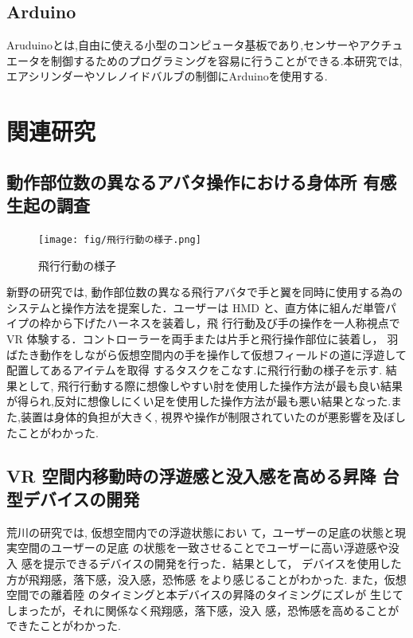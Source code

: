 \subsection{Arduino}

Aruduinoとは,自由に使える小型のコンピュータ基板であり,センサーやアクチュエータを制御するためのプログラミングを容易に行うことができる.本研究では,エアシリンダーやソレノイドバルブの制御にArduinoを使用する.

\section{関連研究}

\subsection{動作部位数の異なるアバタ操作における身体所
有感生起の調査}

\begin{figure}[htbp]
  \centering
  \texttt{[image: fig/飛行行動の様子.png]}
  \caption{飛行行動の様子}
  \label{fig:chart1}
\end{figure}

新野の研究では, 動作部位数の異なる飛行アバタで手と翼を同時に使用する為のシステムと操作方法を提案した．ユーザーは HMD と、直方体に組んだ単管パイプの枠から下げたハーネスを装着し，飛
行行動及び手の操作を一人称視点で VR 体験する．コントローラーを両手または片手と飛行操作部位に装着し，
羽ばたき動作をしながら仮想空間内の手を操作して仮想フィールドの道に浮遊して配置してあるアイテムを取得
するタスクをこなす.に飛行行動の様子を示す.
結果として, 飛行行動する際に想像しやすい肘を使用した操作方法が最も良い結果が得られ,反対に想像しにくい足を使用した操作方法が最も悪い結果となった.また,装置は身体的負担が大きく, 視界や操作が制限されていたのが悪影響を及ぼしたことがわかった.



\subsection{VR 空間内移動時の浮遊感と没入感を高める昇降
台型デバイスの開発}

荒川の研究では, 仮想空間内での浮遊状態におい
て，ユーザーの足底の状態と現実空間のユーザーの足底
の状態を一致させることでユーザーに高い浮遊感や没入
感を提示できるデバイスの開発を行った．結果として，
デバイスを使用した方が飛翔感，落下感，没入感，恐怖感
をより感じることがわかった. また，仮想空間での離着陸
のタイミングと本デバイスの昇降のタイミングにズレが
生じてしまったが，それに関係なく飛翔感，落下感，没入
感，恐怖感を高めることができたことがわかった.

